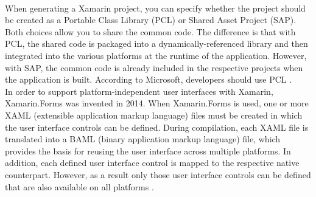 \documentclass[Bachelor,BIF,english]{twbook}
\begin{document}
\\[\baselineskip]
When generating a Xamarin project, you can specify whether the project should be created as a Portable Class Library (PCL) or Shared Asset Project (SAP). Both choices allow you to share the common code. The difference is that with PCL, the shared code is packaged into a dynamically-referenced library and then integrated into the various platforms at the runtime of the application. However, with SAP, the common code is already included in the respective projects when the application is built. According to Microsoft, developers should use PCL \cite[p.~16]{ZubaBernhard2017EdPb} \cite[p.~8-9]{Dickson_2013}.
\\[\baselineskip] 
In order to support platform-independent user interfaces with Xamarin, Xamarin.Forms was invented in 2014. When Xamarin.Forms is used, one or more XAML (extensible application markup language) files must be created in which the user interface controls can be defined. During compilation, each XAML file is translated into a BAML (binary application markup language) file, which provides the basis for reusing the user interface across multiple platforms. In addition, each defined user interface control is mapped to the respective native counterpart. However, as a result only those user interface controls can be defined that are also available on all platforms \cite[p.~17-18]{ZubaBernhard2017EdPb}.
\end{document}
